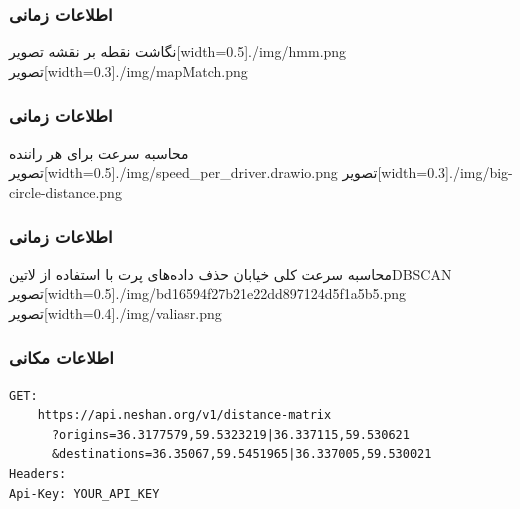 \documentclass{beamer}
\begin{document}
\begin{frame}
  \frametitle{اطلاعات زمانی}
  \setcounter{enumi}{1}
   نگاشت نقطه بر نقشه
  ‌تصویر[width=0.5\textwidth]{./img/hmm.png}
  \hfill
  ‌تصویر[width=0.3\textwidth]{./img/mapMatch.png}
\end{frame}

\begin{frame}
  \frametitle{اطلاعات زمانی}
  \setcounter{enumi}{2}
   محاسبه سرعت برای هر راننده
  ‌تصویر[width=0.5\textwidth]{./img/speed_per_driver.drawio.png}
  \hfill
  ‌تصویر[width=0.3\textwidth]{./img/big-circle-distance.png}
\end{frame}

\begin{frame}
  \frametitle{اطلاعات زمانی}
  \setcounter{enumi}{3}
   محاسبه سرعت کلی خیابان
   حذف داده‌های پرت با استفاده از ‌لاتین{DBSCAN}
  ‌تصویر[width=0.5\textwidth]{./img/bd16594f27b21e22dd897124d5f1a5b5.png}
  \hfill
  ‌تصویر[width=0.4\textwidth]{./img/valiasr.png}
\end{frame}

\begin{frame}[fragile]
  \frametitle{اطلاعات مکانی}
  \scriptsize
  \begin{latin}
    \begin{verbatim}
GET:
    https://api.neshan.org/v1/distance-matrix
      ?origins=36.3177579,59.5323219|36.337115,59.530621
      &destinations=36.35067,59.5451965|36.337005,59.530021
Headers:
Api-Key: YOUR_API_KEY
    \end{verbatim}
  \end{latin}
\end{frame}
\end{document}
